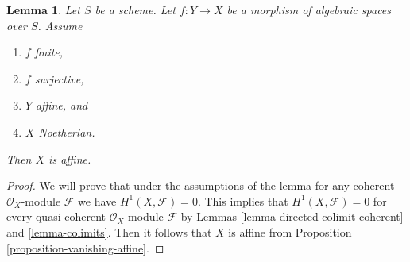 \documentclass{stacks-project}
\theoremstyle{plain}
\newtheorem{lemma}[subsection]{Lemma}
\theoremstyle{definition}
\theoremstyle{remark}
\numberwithin{equation}{subsection}
\begin{document}
\begin{lemma}
\label{lemma-image-affine-finite-morphism-affine-Noetherian}
Let $S$ be a scheme. Let $f : Y \to X$ be a morphism of algebraic
spaces over $S$. Assume
\begin{enumerate}
\item $f$ finite,
\item $f$ surjective,
\item $Y$ affine, and
\item $X$ Noetherian.
\end{enumerate}
Then $X$ is affine.
\end{lemma}

\begin{proof}
We will prove that under the assumptions of the lemma for any coherent
$\mathcal{O}_X$-module $\mathcal{F}$ we have $H^1(X, \mathcal{F}) = 0$.
This implies that $H^1(X, \mathcal{F}) = 0$ for every quasi-coherent
$\mathcal{O}_X$-module $\mathcal{F}$ by
Lemmas \ref{lemma-directed-colimit-coherent} and \ref{lemma-colimits}.
Then it follows that $X$ is affine from
Proposition \ref{proposition-vanishing-affine}.


\end{proof}
\end{document}
